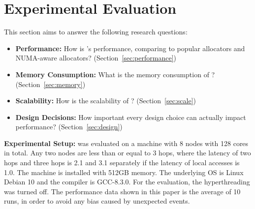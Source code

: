 \section{Experimental Evaluation}
\label{sec:evaluation}

This section aims to answer the following research questions: 

\begin{itemize}
\item \textbf{Performance:} How is \NM{}'s performance, comparing to popular allocators and NUMA-aware allocators? (Section~\ref{sec:performance}) 
\item \textbf{Memory Consumption:} What is the memory consumption of \NM{}? (Section~\ref{sec:memory})
\item \textbf{Scalability:} How is the scalability of \NM{}? (Section~\ref{sec:scale})
\item \textbf{Design Decisions:} How important every design choice can actually impact performance? (Section~\ref{sec:design})	
\end{itemize}

\textbf{Experimental Setup:}  \NM{} was evaluated on a machine with 8 nodes with 128 cores in total. Any two nodes are less than or equal to 3 hops, where the latency of two hops and three hops is 2.1 and 3.1 separately if the latency of local accesses is 1.0. The machine is installed with 512GB memory. The underlying OS is Linux Debian 10 and the compiler is GCC-8.3.0. For the evaluation, the hyperthreading was turned off. The performance data shown in this paper is the average of 10 runs, in order to avoid any bias caused by unexpected events.  

